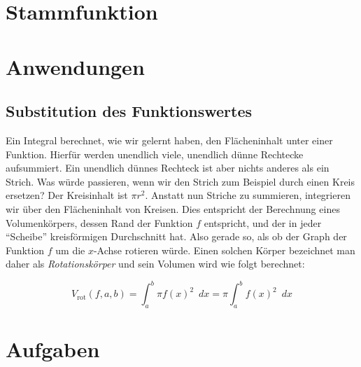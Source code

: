 \section{Stammfunktion}

\begin{TODO}
\end{TODO}


\section{Anwendungen}

\subsection{Substitution des Funktionswertes}

Ein Integral berechnet, wie wir gelernt haben, den Flächeninhalt unter einer Funktion. Hierfür werden unendlich viele, unendlich dünne Rechtecke aufsummiert. Ein unendlich dünnes Rechteck ist aber nichts anderes als ein Strich. Was würde passieren, wenn wir den Strich zum Beispiel durch einen Kreis ersetzen? Der Kreisinhalt ist $\pi r^2$. Anstatt nun Striche zu summieren, integrieren wir über den Flächeninhalt von Kreisen. Dies entspricht der Berechnung eines Volumenkörpers, dessen Rand der Funktion $f$ entspricht, und der in jeder "`Scheibe"' kreisförmigen Durchschnitt hat. Also gerade so, als ob der Graph der Funktion $f$ um die $x$-Achse rotieren würde. Einen solchen Körper bezeichnet man daher als \emph{Rotationskörper} und sein Volumen wird wie folgt berechnet:

\begin{equation}
V_{\text{rot}}(f,a,b) = \int_a^b \pi f(x)^2 \enspace dx=  \pi \int_a^b f(x)^2 \enspace dx
\end{equation}

\begin{TODO}
\end{TODO}

\section{Aufgaben}